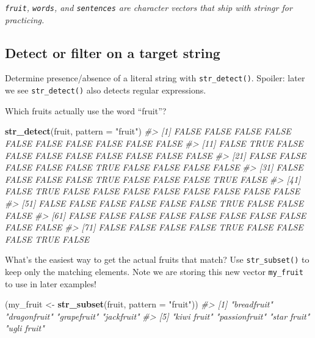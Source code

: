 \documentclass[
]{book}
\newenvironment{Shaded}{\begin{snugshade}}{\end{snugshade}}
\newcommand{\CommentTok}[1]{\textcolor[rgb]{0.56,0.35,0.01}{\textit{#1}}}
\newcommand{\DataTypeTok}[1]{\textcolor[rgb]{0.13,0.29,0.53}{#1}}
\newcommand{\KeywordTok}[1]{\textcolor[rgb]{0.13,0.29,0.53}{\textbf{#1}}}
\newcommand{\NormalTok}[1]{#1}
\newcommand{\StringTok}[1]{\textcolor[rgb]{0.31,0.60,0.02}{#1}}
\begin{document}
\emph{\texttt{fruit}, \texttt{words}, and \texttt{sentences} are character vectors that ship with stringr for practicing.}

\hypertarget{detect-or-filter-on-a-target-string}{%
\subsection{Detect or filter on a target string}\label{detect-or-filter-on-a-target-string}}

Determine presence/absence of a literal string with \texttt{str\_detect()}. Spoiler: later we see \texttt{str\_detect()} also detects regular expressions.

Which fruits actually use the word ``fruit''?

\begin{Shaded}
\begin{Highlighting}[]
\KeywordTok{str_detect}\NormalTok{(fruit, }\DataTypeTok{pattern =} \StringTok{"fruit"}\NormalTok{)}
\CommentTok{#>  [1] FALSE FALSE FALSE FALSE FALSE FALSE FALSE FALSE FALSE FALSE}
\CommentTok{#> [11] FALSE  TRUE FALSE FALSE FALSE FALSE FALSE FALSE FALSE FALSE}
\CommentTok{#> [21] FALSE FALSE FALSE FALSE FALSE  TRUE FALSE FALSE FALSE FALSE}
\CommentTok{#> [31] FALSE FALSE FALSE FALSE  TRUE FALSE FALSE FALSE  TRUE FALSE}
\CommentTok{#> [41] FALSE  TRUE FALSE FALSE FALSE FALSE FALSE FALSE FALSE FALSE}
\CommentTok{#> [51] FALSE FALSE FALSE FALSE FALSE FALSE  TRUE FALSE FALSE FALSE}
\CommentTok{#> [61] FALSE FALSE FALSE FALSE FALSE FALSE FALSE FALSE FALSE FALSE}
\CommentTok{#> [71] FALSE FALSE FALSE FALSE  TRUE FALSE FALSE FALSE  TRUE FALSE}
\end{Highlighting}
\end{Shaded}

What's the easiest way to get the actual fruits that match? Use \texttt{str\_subset()} to keep only the matching elements. Note we are storing this new vector \texttt{my\_fruit} to use in later examples!

\begin{Shaded}
\begin{Highlighting}[]
\NormalTok{(my_fruit <-}\StringTok{ }\KeywordTok{str_subset}\NormalTok{(fruit, }\DataTypeTok{pattern =} \StringTok{"fruit"}\NormalTok{))}
\CommentTok{#> [1] "breadfruit"   "dragonfruit"  "grapefruit"   "jackfruit"   }
\CommentTok{#> [5] "kiwi fruit"   "passionfruit" "star fruit"   "ugli fruit"}
\end{Highlighting}
\end{Shaded}
\end{document}
